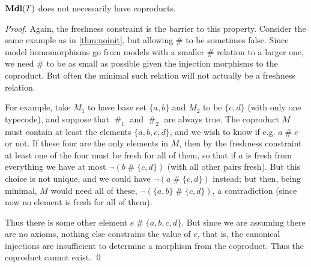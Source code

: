 \documentclass[runningheads,a4paper]{llncs}
\newcommand{\fresh}{\mathbin{\#}}
\begin{document}
\begin{theorem}
${\bf Mdl}(T)$ does not necessarily have coproducts.
\end{theorem}
\begin{proof}
Again, the freshness constraint is the barrier to this property. Consider the same example as in \autoref{thm:noinit}, but allowing $\fresh$ to be sometimes false. Since model homomorphisms go from models with a smaller $\fresh$ relation to a larger one, we need $\fresh$ to be as small as possible given the injection morphisms to the coproduct. But often the minimal such relation will not actually be a freshness relation.

For example, take $M_1$ to have base set $\{a,b\}$ and $M_2$ to be $\{c,d\}$ (with only one typecode), and suppose that $\fresh_1$ and $\fresh_2$ are always true. The coproduct $M$ must contain at least the elements $\{a,b,c,d\}$, and we wish to know if e.g. $a\fresh c$ or not. If these four are the only elements in $M$, then by the freshness constraint at least one of the four must be fresh for all of them, so that if $a$ is fresh from everything we have at most $\neg(b\fresh\{c,d\})$ (with all other pairs fresh). But this choice is not unique, and we could have $\neg(a\fresh\{c,d\})$ instead; but then, being minimal, $M$ would need all of these, $\neg(\{a,b\}\fresh\{c,d\})$, a contradiction (since now no element is fresh for all of them).

Thus there is some other element $e\fresh\{a,b,c,d\}$. But since we are assuming there are no axioms, nothing else constrains the value of $e$, that is, the canonical injections are insufficient to determine a morphism from the coproduct. Thus the coproduct cannot exist.
\qed\end{proof}
\end{document}
